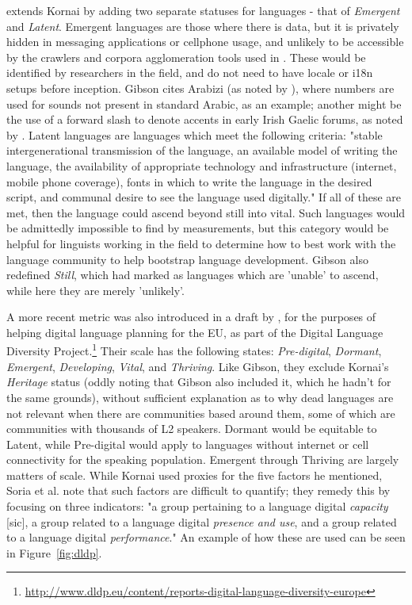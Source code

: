 \citet{gibson2016assessing} extends Kornai by adding two separate statuses for languages - that of {\it Emergent} and {\it Latent}. Emergent languages are those where there is data, but it is privately hidden in messaging applications or cellphone usage, and unlikely to be accessible by the crawlers and corpora agglomeration tools used in \citet{kornai2013digital}. These would be identified by researchers in the field, and do not need to have locale or i18n setups before inception. Gibson cites Arabizi (as noted by \citet{darwish2013arabizi}), where numbers are used for sounds not present in standard Arabic, as an example; another might be the use of a forward slash to denote accents in early Irish Gaelic forums, as noted by \citet{scannell2007crubadan}. Latent languages are languages which meet the following criteria: "stable intergenerational transmission of the language, an available model of writing the language, the availability of appropriate technology and infrastructure (internet, mobile phone coverage), fonts in which to write the language in the desired script, and communal desire to see the language used digitally." If all of these are met, then the language could ascend beyond still into vital. Such languages would be admittedly impossible to find by measurements, but this category would be helpful for linguists working in the field to determine how to best work with the language community to help bootstrap language development. Gibson also redefined {\it Still}, which \citet{kornai2013digital} had marked as languages which are 'unable' to ascend, while here they are merely 'unlikely'.

A more recent metric was also introduced in a draft by \citet{soria2017digital}, for the purposes of helping digital language planning for the EU, as part of the Digital Language Diversity Project.\footnote{\href{http://www.dldp.eu/content/reports-digital-language-diversity-europe}{http://www.dldp.eu/content/reports-digital-language-diversity-europe}} Their scale has the following states: {\it Pre-digital}, {\it Dormant}, {\it Emergent}, {\it Developing}, {\it Vital}, and {\it Thriving}. Like Gibson, they exclude Kornai's {\it Heritage} status (oddly noting that Gibson also included it, which he hadn't for the same grounds), without sufficient explanation as to why dead languages are not relevant when there are communities based around them, some of which are communities with thousands of L2 speakers. %
Dormant would be equitable to Latent, while Pre-digital would apply to languages without internet or cell connectivity for the speaking population. Emergent through Thriving are largely matters of scale. While Kornai used proxies for the five factors he mentioned, Soria et al. note that such factors are difficult to quantify; they remedy this by focusing on three indicators: "a group pertaining to a language digital {\it capacity} [sic], a group related to a language digital {\it presence and use}, and a group related to a language digital {\it performance}." \citep[5]{soria2017digital} An example of how these are used can be seen in Figure~\ref{fig:dldp}.

